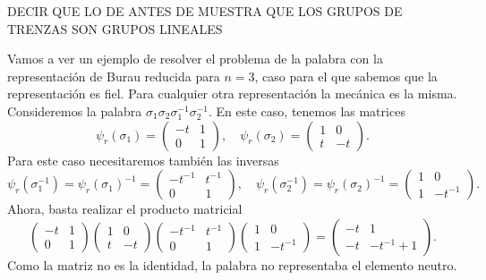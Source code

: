 \documentclass[TFG.tex]{subfiles}
\begin{document}
DECIR QUE LO DE ANTES DE MUESTRA QUE LOS GRUPOS DE TRENZAS SON GRUPOS LINEALES
\begin{ej}
Vamos a ver un ejemplo de resolver el problema de la palabra con la representación de Burau reducida para $n=3$, caso para el que sabemos que la representación es fiel. Para cualquier otra representación la mecánica es la misma. Consideremos la palabra $\sigma_1\sigma_2\sigma_1^{-1}\sigma_2^{-1}$. En este caso, tenemos las matrices
\[
\psi_r(\sigma_1)=\begin{pmatrix}
-t&1 \\
0 & 1
\end{pmatrix},\quad \psi_r(\sigma_2)=\begin{pmatrix}
1&0 \\
t&-t
\end{pmatrix}.
\]
Para este caso necesitaremos también las inversas
\[
\psi_r(\sigma_1^{-1})=\psi_r(\sigma_1)^{-1}=\begin{pmatrix}
-t^{-1}&t^{-1} \\
0&1
\end{pmatrix},\quad \psi_r(\sigma_2^{-1})=\psi_r(\sigma_2)^{-1}=\begin{pmatrix}
1&0 \\
1&-t^{-1}
\end{pmatrix}.
\]
Ahora, basta realizar el producto matricial
\[
\begin{pmatrix}
-t&1 \\
0 & 1
\end{pmatrix}\begin{pmatrix}
1&0 \\
t&-t
\end{pmatrix}\begin{pmatrix}
-t^{-1}&t^{-1} \\
0&1
\end{pmatrix}\begin{pmatrix}
1&0 \\
1&-t^{-1}
\end{pmatrix}=
\begin{pmatrix}
-t& 1\\
-t& -t^{-1}+1
\end{pmatrix}.
\]
Como la matriz no es la identidad, la palabra no representaba el elemento neutro.
\end{ej}
\end{document}
